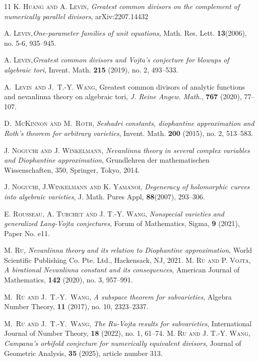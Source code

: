 \documentclass[10pt]{amsart}
\numberwithin{equation}{section}
\theoremstyle{plain}
\theoremstyle{definition}
\begin{document}
\begin{thebibliography}{11}
\textsc{K. Huang and A. Levin}, \textit{Greatest common divisors on the complement
of numerically parallel divisors},  arXiv:2207.14432

\textsc{A. Levin},\textit{One-parameter families of unit equations}, Math. Res. Lett. {\bf 13}(2006), no. 5-6, 935--945.

\textsc{A. Levin},\textit{Greatest common divisors and Vojta's conjecture for blowups of algebraic
tori}, Invent. Math. {\bf 215} (2019), no. 2, 493--533.

\textsc{A.~Levin and J.~T.-Y. Wang},
  Greatest common divisors of analytic functions and nevanlinna theory on
  algebraic tori,  \emph{J. Reine Angew. Math.}, \textbf{767}
  (2020), 77--107.


 \textsc{D.~McKinnon and M.~Roth}, 
  \emph{Seshadri constants, diophantine approximation and Roth's theorem for arbitrary varieties}, 
  Invent. Math.   {\bf 200} (2015),  no. 2, 513--583.


\textsc{J. Noguchi and J. Winkelmann}, \textit{Nevanlinna theory in several complex variables and Diophantine approximation}, Grundlehren der mathematischen Wissenschaften, 350, Springer, Tokyo, 2014.


  \textsc{J. Noguchi, J.Winkelmann and K. Yamanoi,} 
  \emph{Degeneracy of holomorphic curves into algebraic varieties},  J. Math. Pures  Appl, \textbf{88}(2007), 293--306.



\textsc{E. Rousseau, A. Turchet and J. T.-Y. Wang}, \textit{Nonspecial varieties and generalized Lang-Vojta conjectures}, Forum of Mathematics, Sigma, {\bf 9} (2021), Paper No. e11.

\textsc{M. Ru}, \textit{ Nevanlinna theory and its relation to Diophantine approximation}, World Scientific Publishing Co. Pte. Ltd., Hackensack, NJ, 2021.
\textsc{M. Ru and P. Vojta}, \textit{A birational Nevanlinna constant and its consequences}, American Journal of Mathematics, {\bf 142} (2020), no. 3, 957--991.

\textsc{M.~Ru and J.~T.-Y.~Wang},
\emph{A subspace theorem for subvarieties},
  Algebra Number Theory, {\bf 11} (2017), no. 10, 2323--2337.

\textsc{M.~Ru and J.~T.-Y.~Wang},
\emph{The Ru-Vojta results for subvarieties},
  International Journal of Number Theory, {\bf 18} (2022), no. 1, 61--74. 
\textsc{M. Ru  and J. T.-Y. Wang}, \textit{Campana's orbifold conjecture for numerically equivalent divisors}, Journal of Geometric Analysis, {\bf 35} (2025), article number 313.


\end{thebibliography}
\end{document}
